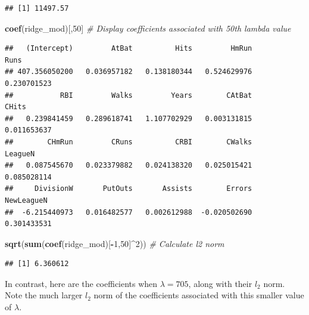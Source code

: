 \documentclass[
  openany]{book}
\newenvironment{Shaded}{\begin{snugshade}}{\end{snugshade}}
\newcommand{\CommentTok}[1]{\textcolor[rgb]{0.56,0.35,0.01}{\textit{#1}}}
\newcommand{\DecValTok}[1]{\textcolor[rgb]{0.00,0.00,0.81}{#1}}
\newcommand{\KeywordTok}[1]{\textcolor[rgb]{0.13,0.29,0.53}{\textbf{#1}}}
\newcommand{\NormalTok}[1]{#1}
\newcommand{\OperatorTok}[1]{\textcolor[rgb]{0.81,0.36,0.00}{\textbf{#1}}}
\begin{document}
\begin{Shaded}
\end{Shaded}

\begin{verbatim}
## [1] 11497.57
\end{verbatim}

\begin{Shaded}
\begin{Highlighting}[]
\KeywordTok{coef}\NormalTok{(ridge_mod)[,}\DecValTok{50}\NormalTok{] }\CommentTok{# Display coefficients associated with 50th lambda value}
\end{Highlighting}
\end{Shaded}

\begin{verbatim}
##   (Intercept)         AtBat          Hits         HmRun          Runs 
## 407.356050200   0.036957182   0.138180344   0.524629976   0.230701523 
##           RBI         Walks         Years        CAtBat         CHits 
##   0.239841459   0.289618741   1.107702929   0.003131815   0.011653637 
##        CHmRun         CRuns          CRBI        CWalks       LeagueN 
##   0.087545670   0.023379882   0.024138320   0.025015421   0.085028114 
##     DivisionW       PutOuts       Assists        Errors    NewLeagueN 
##  -6.215440973   0.016482577   0.002612988  -0.020502690   0.301433531
\end{verbatim}

\begin{Shaded}
\begin{Highlighting}[]
\KeywordTok{sqrt}\NormalTok{(}\KeywordTok{sum}\NormalTok{(}\KeywordTok{coef}\NormalTok{(ridge_mod)[}\OperatorTok{-}\DecValTok{1}\NormalTok{,}\DecValTok{50}\NormalTok{]}\OperatorTok{^}\DecValTok{2}\NormalTok{)) }\CommentTok{# Calculate l2 norm}
\end{Highlighting}
\end{Shaded}

\begin{verbatim}
## [1] 6.360612
\end{verbatim}

In contrast, here are the coefficients when \(\lambda = 705\), along with their \(l_2\)
norm. Note the much larger \(l_2\) norm of the coefficients associated with this
smaller value of \(\lambda\).
\end{document}
